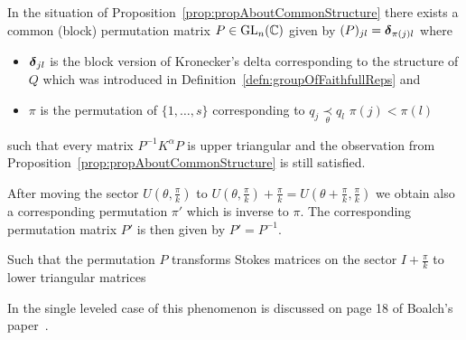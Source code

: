 \begin{cor}
  In the situation of Proposition~\ref{prop:propAboutCommonStructure}
  there exists a common (block) permutation matrix $P\in\operatorname{GL}_n(\mathbb{C})$ given by
  $(P)_{jl}=\boldsymbol{\delta}_{\pi(j)l}$ where
  \begin{itemize}
  \item $\boldsymbol{\delta}_{jl}$ is the block version of Kronecker's delta corresponding
    to the structure of $Q$ which was introduced in
    Definition~\ref{defn:groupOfFaithfullReps} and
  \item $\pi$ is the permutation of $\{1,\dots,s\}$ corresponding to
    $q_j\underset{\theta}{\prec}q_l$ \Leftrightarrow{} $\pi(j)<\pi(l)$
  \end{itemize}
  such that every matrix $P^{-1}K^{\alpha}P$ is upper triangular and the
  observation from Proposition~\ref{prop:propAboutCommonStructure} is still
  satisfied.
  \begin{s-rem}
    After moving the sector $U(\theta,\frac{\pi}{k})$ to
    $U(\theta,\frac{\pi}{k})+\frac{\pi}{k}
    =U(\theta+\frac{\pi}{k},\frac{\pi}{k})$ we obtain also a corresponding
    permutation $\pi'$ which is inverse to $\pi$.
    The corresponding permutation matrix $P'$ is then given by $P'=P^{-1}$.

    Such that the permutation $P$ transforms Stokes matrices on the sector
    $I+\frac{\pi}{k}$ to lower triangular matrices
  \end{s-rem}
  In the single leveled case of this phenomenon is discussed on page 18 of
  Boalch's paper~\cite{boalch}.
\end{cor}

